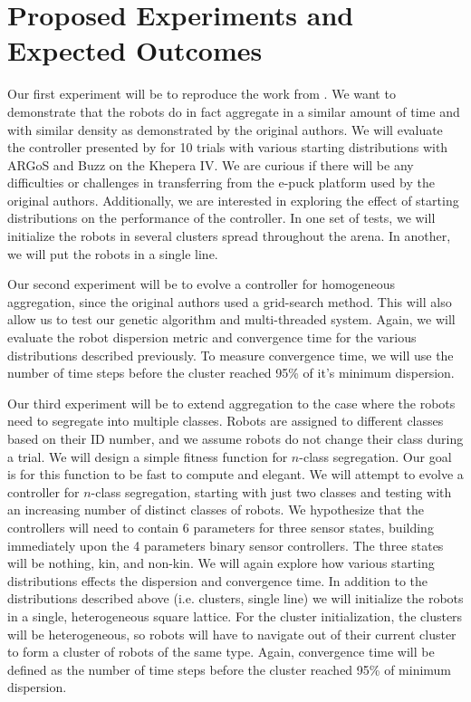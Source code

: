 \documentclass[conference]{IEEEtran}
\begin{document}
\section{Proposed Experiments and Expected Outcomes}

  Our first experiment will be to reproduce the work from \cite{gauci_self-organized_2014}. We want to demonstrate that the robots do in fact aggregate in a similar amount of time and with similar density as demonstrated by the original authors. We will evaluate the controller presented by \cite{gauci_self-organized_2014} for 10 trials with various starting distributions with ARGoS and Buzz on the Khepera IV. We are curious if there will be any difficulties or challenges in transferring from the e-puck platform used by the original authors. Additionally, we are interested in exploring the effect of starting distributions on the performance of the controller. In one set of tests, we will initialize the robots in several clusters spread throughout the arena. In another, we will put the robots in a single line.
  
  Our second experiment will be to evolve a controller for homogeneous aggregation, since the original authors used a grid-search method. This will also allow us to test our genetic algorithm and multi-threaded system. Again, we will evaluate the robot dispersion metric and convergence time for the various distributions described previously. To measure convergence time, we will use the number of time steps before the cluster reached 95\% of it's minimum dispersion.

  Our third experiment will be to extend aggregation to the case where the robots need to segregate into multiple classes. Robots are assigned to different classes based on their ID number, and we assume robots do not change their class during a trial. We will design a simple fitness function for $n$-class segregation. Our goal is for this function to be fast to compute and elegant. We will attempt to evolve a controller for $n$-class segregation, starting with just two classes and testing with an increasing number of distinct classes of robots. We hypothesize that the controllers will need to contain 6 parameters for three sensor states, building immediately upon the 4 parameters binary sensor controllers. The three states will be nothing, kin, and non-kin. We will again explore how various starting distributions effects the dispersion and convergence time. In addition to the distributions described above (i.e. clusters, single line) we will initialize the robots in a single, heterogeneous square lattice. For the cluster initialization, the clusters will be heterogeneous, so robots will have to navigate out of their current cluster to form a cluster of robots of the same type. Again, convergence time will be defined as the number of time steps before the cluster reached 95\% of minimum dispersion.
\end{document}
